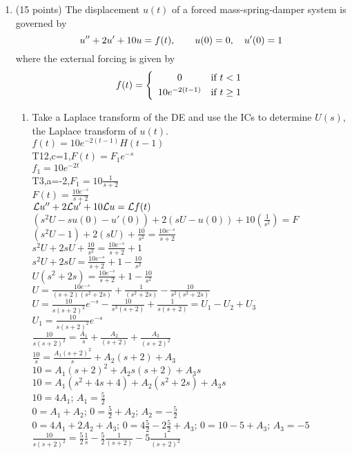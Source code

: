 \documentclass{article}
\begin{document}
\begin{enumerate}
\bigskip
\item (15 points) The displacement $u(t)$ of a forced mass-spring-damper system is governed by
\[
u\sp{\prime\prime}+2u\sp\prime+10u=f(t),\qquad u(0)=0,\quad u\sp\prime(0)=1
\]
where the external forcing is given by
\[
f(t)=\left\{\begin{array}{cl} 0 & \hbox{if $t<1$}\smallskip\\ 10e\sp{-2(t-1)} & \hbox{if $t\ge1$}\end{array}\right.
\]
\begin{enumerate}
\item Take a Laplace transform of the DE and use the ICs to determine $U(s)$, the Laplace transform of $u(t)$.
\\$f(t)=10e^{-2(t-1)}H(t-1)$
\\T12,c=1,$F(t)=F_1e^{-s}$
\\$f_1=10e^{-2t}$
\\T3,a=-2,$F_1=10\frac{1}{s+2}$
\\$F(t)=\frac{10e^{-s}}{s+2}$
\\${\cal L}u''+2{\cal L}u'+10{\cal L}u={\cal L}f(t)$
\\$(s^2U-su(0)-u'(0))+2(sU-u(0))+10(\frac{1}{s^2})=F$
\\$(s^2U-1)+2(sU)+\frac{10}{s^2}=\frac{10e^{-s}}{s+2}$
\\$s^2U+2sU+\frac{10}{s^2}=\frac{10e^{-s}}{s+2}+1$
\\$s^2U+2sU=\frac{10e^{-s}}{s+2}+1-\frac{10}{s^2}$
\\$U(s^2+2s)=\frac{10e^{-s}}{s+2}+1-\frac{10}{s^2}$
\\$U=\frac{10e^{-s}}{(s+2)(s^2+2s)}+\frac{1}{(s^2+2s)}-\frac{10}{s^2(s^2+2s)}$
\\$U=\frac{10}{s(s+2)^2}e^{-s}-\frac{10}{s^3(s+2)}+\frac{1}{s(s+2)}=U_1-U_2+U_3$
\\$U_1=\frac{10}{s(s+2)^2}e^{-s}$
\\$\frac{10}{s(s+2)^2}=\frac{A_1}{s}+\frac{A_2}{(s+2)}+\frac{A_3}{(s+2)^2}$
\\$\frac{10}{s}=\frac{A_1(s+2)^2}{s}+A_2(s+2)+A_3$
\\$10=A_1(s+2)^2+A_2s(s+2)+A_3s$
\\$10=A_1(s^2+4s+4)+A_2(s^2+2s)+A_3s$
\\$10=4A_1$; $A_1=\frac{5}{2}$
\\$0=A_1+A_2$; $0=\frac{5}{2}+A_2$; $A_2=-\frac{5}{2}$
\\$0=4A_1+2A_2+A_3$; $0=4\frac{5}{2}-2\frac{5}{2}+A_3$; $0=10-5+A_3$; $A_3=-5$
\\$\frac{10}{s(s+2)^2}=\frac{5}{2}\frac{1}{s}-\frac{5}{2}\frac{1}{(s+2)}-5\frac{1}{(s+2)^2}$

\end{enumerate}
\end{enumerate}
\end{document}
